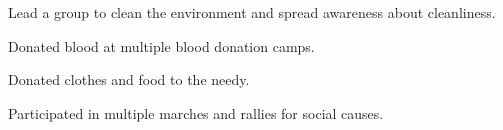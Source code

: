 \begin{resume_list}
  \item Lead a group to clean the environment and spread awareness about cleanliness.
  \item Donated blood at multiple blood donation camps.
  \item Donated clothes and food to the needy.
  \item Participated in multiple marches and rallies for social causes.
\end{resume_list}

